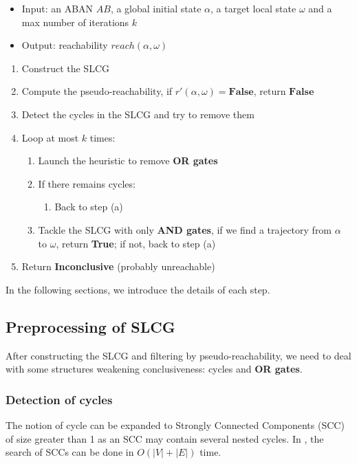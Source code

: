 \documentclass[runningheads]{llncs}
\begin{document}
\begin{itemize}
    \item Input: an ABAN $AB$, a global initial state $\alpha$, a target local state $\omega$ and a max number of iterations $k$
    \item Output: reachability $reach(\alpha, \omega)$
\end{itemize}
\begin{enumerate}
\item Construct the SLCG
\item Compute the pseudo-reachability, if $r'(\alpha,\omega)=\mathbf{False}$, return $\mathbf{False}$
\item Detect the cycles in the SLCG and try to remove them 
\item Loop at most $k$ times:
\begin{enumerate}
    \item Launch the heuristic to remove \textbf{OR gates} 
    \item If there remains cycles:
    \begin{enumerate}
        \item Back to step (a)
    \end{enumerate}
    \item Tackle the SLCG with only \textbf{AND gates}, if we find a trajectory from $\alpha$ to $\omega$, return \textbf{True}; if not, back to step (a)
\end{enumerate}
\item Return \textbf{Inconclusive} (probably unreachable)
\end{enumerate}

In the following sections, we introduce the details of each step.

\subsection{Preprocessing of SLCG}\label{sectprecond}
After constructing the SLCG and filtering by pseudo-reachability, we need to deal with some structures weakening conclusiveness: cycles and \textbf{OR gates}.
\subsubsection{Detection of cycles}
The notion of cycle can be expanded to Strongly Connected Components (SCC) of size greater than 1 as an SCC may contain several nested cycles. 
In \cite{tarjan1972}, the search of SCCs can be done in $O(|V|+|E|)$ time. 
\end{document}
